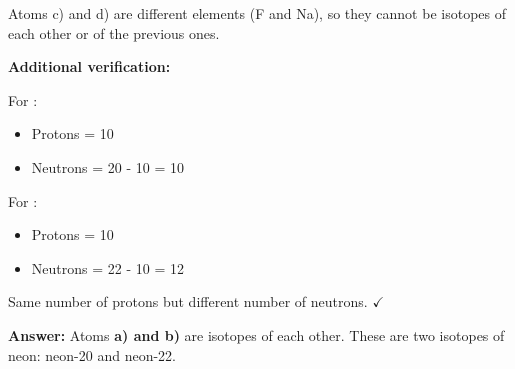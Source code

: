 \begin{exercise}
\begin{solu}
        Atoms c) and d) are different elements (F and Na), so they cannot be isotopes of each other or of the previous ones.

        \textbf{Additional verification:}

        For :
        \begin{itemize}
            \item Protons = 10
            \item Neutrons = 20 - 10 = 10
        \end{itemize}

        For :
        \begin{itemize}
            \item Protons = 10
            \item Neutrons = 22 - 10 = 12
        \end{itemize}

        Same number of protons but different number of neutrons. \( \checkmark \)

        \textbf{Answer:} Atoms \textbf{a) and b)} are isotopes of each other. These are two isotopes of neon: neon-20 and neon-22.
    \end{solu}
\end{exercise}

